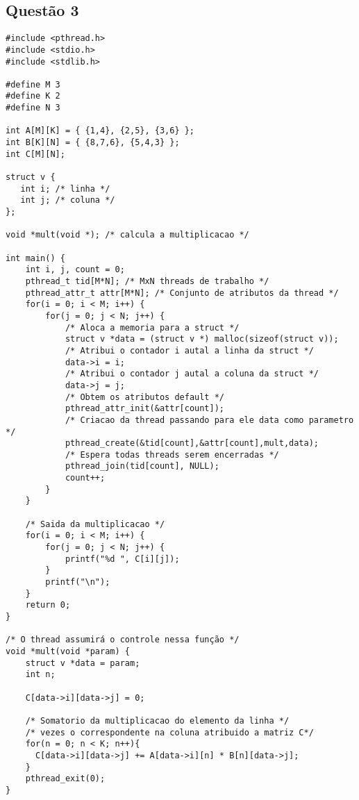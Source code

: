\documentclass[
	article,			%
	11pt,				%
	oneside,			%
	a4paper,			%
	english,			%
	brazil,				%
	sumario=tradicional
	]{abntex2}
\begin{document}
\begin{anexosenv}
\chapter{Questão 3}

\begin{lstlisting}
#include <pthread.h>
#include <stdio.h>
#include <stdlib.h>

#define M 3
#define K 2
#define N 3

int A[M][K] = { {1,4}, {2,5}, {3,6} };
int B[K][N] = { {8,7,6}, {5,4,3} };
int C[M][N];

struct v {
   int i; /* linha */
   int j; /* coluna */
};

void *mult(void *); /* calcula a multiplicacao */

int main() {
    int i, j, count = 0;   
    pthread_t tid[M*N]; /* MxN threads de trabalho */
    pthread_attr_t attr[M*N]; /* Conjunto de atributos da thread */
    for(i = 0; i < M; i++) {
        for(j = 0; j < N; j++) {
        	/* Aloca a memoria para a struct */
            struct v *data = (struct v *) malloc(sizeof(struct v));
            /* Atribui o contador i autal a linha da struct */
            data->i = i;
            /* Atribui o contador j autal a coluna da struct */
            data->j = j; 
            /* Obtem os atributos default */
            pthread_attr_init(&attr[count]); 
            /* Criacao da thread passando para ele data como parametro */
            pthread_create(&tid[count],&attr[count],mult,data); 
            /* Espera todas threads serem encerradas */
            pthread_join(tid[count], NULL); 
            count++;
        }
    }

    /* Saida da multiplicacao */
    for(i = 0; i < M; i++) {
        for(j = 0; j < N; j++) {
            printf("%d ", C[i][j]);
        }
        printf("\n");
    }
    return 0;
}

/* O thread assumirá o controle nessa função */
void *mult(void *param) {
    struct v *data = param;
    int n;

    C[data->i][data->j] = 0;

    /* Somatorio da multiplicacao do elemento da linha */
    /* vezes o correspondente na coluna atribuido a matriz C*/
    for(n = 0; n < K; n++){
      C[data->i][data->j] += A[data->i][n] * B[n][data->j];
    }
    pthread_exit(0);
}
\end{lstlisting}

\end{anexosenv}
\end{document}
